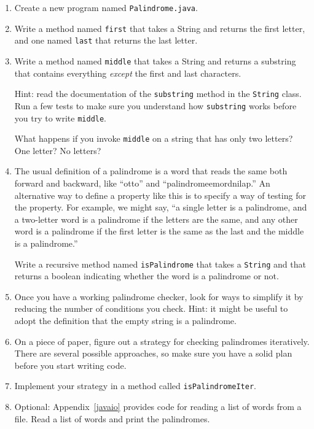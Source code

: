 \begin{exercise}
\label{palindrome}

\begin{enumerate}

\item Create a new program named {\tt Palindrome.java}.

\item Write a method named {\tt first}
that takes a String and returns the first letter, and one named
{\tt last} that returns the last letter.

\item Write a method named {\tt middle} that takes a String and
returns a substring that contains everything {\em except} the
first and last characters.

Hint: read the documentation of the {\tt substring} method in
the {\tt String} class.
Run a few tests to make sure you understand how {\tt substring} works
before you try to write {\tt middle}.

What happens if you invoke {\tt middle} on a string that has only
two letters?  One letter?  No letters?

\item The usual definition of a palindrome is a word that reads the
same both forward and backward, like ``otto'' and
``palindromeemordnilap.''  An alternative way to define a property
like this is to specify a way of testing for the property.  For
example, we might say, ``a single letter is a palindrome, and a
two-letter word is a palindrome if the letters are the same, and
any other word is a palindrome if
the first letter is the same as the
last and the middle is a palindrome.''

Write a recursive method named {\tt isPalindrome} that takes
a {\tt String} and that returns a boolean indicating whether the
word is a palindrome or not.

\item Once you have a working palindrome checker, look for ways
to simplify it by reducing the number of conditions you check.
Hint: it might be useful to adopt the definition that the empty
string is a palindrome.

\item On a piece of paper, figure out a strategy for checking
palindromes iteratively.  There are several possible approaches,
so make sure you have a solid plan before you start writing code.

\item Implement your strategy in a method called {\tt isPalindromeIter}.

\item Optional: Appendix~\ref{javaio} provides code for reading a list
of words from a file.  Read a list of words and print the palindromes.

\end{enumerate}
\end{exercise}


